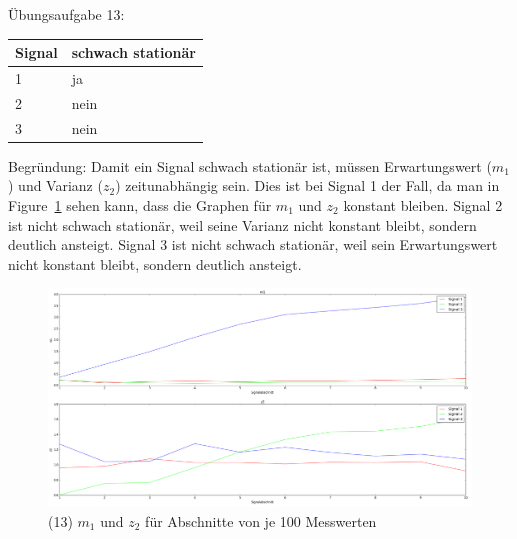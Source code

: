 
    
    Übungsaufgabe 13: \newline \newline
    \begin{tabular}{ | l | l | }
        \hline
        Signal & schwach stationär \\ \hline
        1 & ja \\ \hline
        2 & nein \\ \hline
        3 & nein \\ \hline
    \end{tabular}
    \newline \newline
    Begründung: \newline
    Damit ein Signal schwach stationär ist, müssen Erwartungswert ($m_1$) und Varianz ($z_2$) zeitunabhängig sein.
    Dies ist bei Signal 1 der Fall, da man in Figure~\ref{fig:m1_z2_plt} sehen kann, dass die Graphen für $m_1$ und $z_2$ konstant bleiben.
    Signal 2 ist nicht schwach stationär, weil seine Varianz nicht konstant bleibt, sondern deutlich ansteigt.
    Signal 3 ist nicht schwach stationär, weil sein Erwartungswert nicht konstant bleibt, sondern deutlich ansteigt.

    \begin{figure}
        \includegraphics[width=1.0\textwidth]{A13.png}
        \caption{(13) $m_1$ und $z_2$ für Abschnitte von je 100 Messwerten}
        \label{fig:m1_z2_plt}
    \end{figure}
